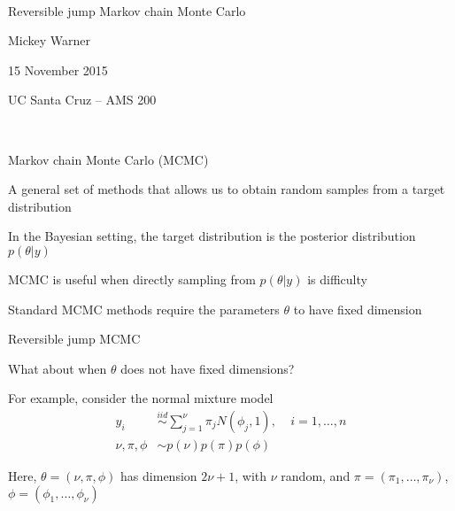 \documentclass[mathserif, 12pt, t]{beamer}
\newcommand{\m}[1]{#1}
\renewcommand{\frametitle}[1]{\vspace{0.14cm}\hspace{-0.70cm}\textcolor{col2}{%
    \Large{#1}}\vspace{0.15cm}\newline}
\begin{document}
\begin{center}
\ \\ [-0.5in]
\vfill
\bigskip
\bigskip
\bigskip
\bigskip
\bigskip

\begin{Large}
\begin{center}
Reversible jump Markov chain Monte Carlo
\end{center}
\end{Large}
\vfill

Mickey Warner
\vfill

15 November 2015
\smallskip

UC Santa Cruz -- AMS 200

\bigskip
\bigskip
\vfill
\ \\ [-0.5in]
\end{center}



\begin{frame}
\frametitle{Markov chain Monte Carlo (MCMC)}

A general set of methods that allows us to obtain random samples from a target distribution
\bigskip

In the Bayesian setting, the target distribution is the posterior distribution $p(\m{\theta}|\m{y})$
\bigskip

MCMC is useful when directly sampling from $p(\m{\theta}|\m{y})$ is difficulty
\bigskip

Standard MCMC methods require the parameters $\m{\theta}$ to have fixed dimension


\end{frame}


\begin{frame}
\frametitle{Reversible jump MCMC}

What about when $\m{\theta}$ does not have fixed dimensions?
\bigskip

For example, consider the normal mixture model
\begin{align*}
y_i &\overset{iid}\sim \sum_{j=1}^\nu \pi_j N(\phi_j, 1),~~~~~i=1,\ldots,n \\
\nu,\m{\pi},\m{\phi} &\sim p(\nu)p(\m{\pi})p(\m{\phi}) 
\end{align*}

Here, $\m{\theta}=(\nu,\m{\pi}, \m{\phi})$ has dimension $2\nu+1$, with $\nu$ random, and $\pi=(\pi_1,\ldots,\pi_\nu)$, $\phi=(\phi_1,\ldots,\phi_\nu)$

\end{frame}
\end{document}

